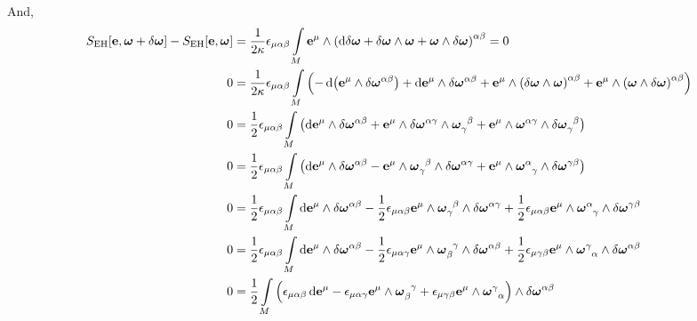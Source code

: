 And,
\begin{align*}
    S_{\textnormal{EH}}\qty[\vb e,\boldsymbol\omega+\delta\boldsymbol\omega]-S_{\textnormal{EH}}\qty[\vb e,\boldsymbol\omega]&=\frac{1}{2\kappa}\epsilon_{\mu\alpha\beta}\int\limits_M\vb e^{\mu}\wedge\qty(\dd{\delta\boldsymbol\omega}+\delta\boldsymbol\omega\wedge\boldsymbol\omega+\boldsymbol\omega\wedge\delta\boldsymbol\omega)^{\alpha\beta}=0\\
    0&=\frac{1}{2\kappa}\epsilon_{\mu\alpha\beta}\int\limits_M\qty(-\dd{\qty(\vb e^\mu\wedge\delta\boldsymbol\omega^{\alpha\beta})}+\dd{\vb e^\mu}\wedge\delta\boldsymbol\omega^{\alpha\beta}+\vb e^\mu\wedge\qty(\delta\boldsymbol\omega\wedge\boldsymbol\omega)^{\alpha\beta}+\vb e^\mu\wedge\qty(\boldsymbol\omega\wedge\delta\boldsymbol\omega)^{\alpha\beta})\\
    0&=\frac{1}{2}\epsilon_{\mu\alpha\beta}\int\limits_M\qty(\dd{\vb e^\mu}\wedge\delta\boldsymbol\omega^{\alpha\beta}+\vb e^\mu\wedge\tensor{\delta\boldsymbol\omega}{^\alpha^\gamma}\wedge\tensor{\boldsymbol\omega}{_\gamma^\beta}+\vb e^\mu\wedge\tensor{\boldsymbol\omega}{^\alpha^\gamma}\wedge\tensor{\delta\boldsymbol\omega}{_\gamma^\beta})\\
    0&=\frac{1}{2}\epsilon_{\mu\alpha\beta}\int\limits_M\qty(\dd{\vb e^\mu}\wedge\delta\boldsymbol\omega^{\alpha\beta}-\vb e^\mu\wedge\tensor{\boldsymbol\omega}{_\gamma^\beta}\wedge\tensor{\delta\boldsymbol\omega}{^\alpha^\gamma}+\vb e^\mu\wedge\tensor{\boldsymbol\omega}{^\alpha_\gamma}\wedge\tensor{\delta\boldsymbol\omega}{^\gamma^\beta})\\
    0&=\frac{1}{2}\epsilon_{\mu\alpha\beta}\int\limits_M\dd{\vb e^\mu}\wedge\delta\boldsymbol\omega^{\alpha\beta}-\frac{1}{2}\epsilon_{\mu\alpha\beta}\vb e^\mu\wedge\tensor{\boldsymbol\omega}{_\gamma^\beta}\wedge\tensor{\delta\boldsymbol\omega}{^\alpha^\gamma}+\frac{1}{2}\epsilon_{\mu\alpha\beta}\vb e^\mu\wedge\tensor{\boldsymbol\omega}{^\alpha_\gamma}\wedge\tensor{\delta\boldsymbol\omega}{^\gamma^\beta}\\
    0&=\frac{1}{2}\epsilon_{\mu\alpha\beta}\int\limits_M\dd{\vb e^\mu}\wedge\delta\boldsymbol\omega^{\alpha\beta}-\frac{1}{2}\epsilon_{\mu\alpha\gamma}\vb e^\mu\wedge\tensor{\boldsymbol\omega}{_\beta^\gamma}\wedge\tensor{\delta\boldsymbol\omega}{^\alpha^\beta}+\frac{1}{2}\epsilon_{\mu\gamma\beta}\vb e^\mu\wedge\tensor{\boldsymbol\omega}{^\gamma_\alpha}\wedge\tensor{\delta\boldsymbol\omega}{^\alpha^\beta}\\
    0&=\frac{1}{2}\int\limits_M\qty(\epsilon_{\mu\alpha\beta}\dd{\vb e^\mu}-\epsilon_{\mu\alpha\gamma}\vb e^\mu\wedge\tensor{\boldsymbol\omega}{_\beta^\gamma}+\epsilon_{\mu\gamma\beta}\vb e^\mu\wedge\tensor{\boldsymbol\omega}{^\gamma_\alpha})\wedge\tensor{\delta\boldsymbol\omega}{^\alpha^\beta}\\

\end{align*}
